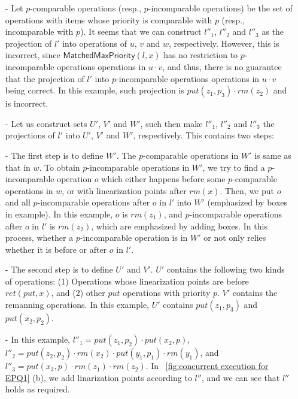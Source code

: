 \begin{itemize}
\setlength{\itemsep}{0.5pt}
\item[-] Let $p$-comparable operations (resp., $p$-incomparable operations) be the set of operations with items whose priority is comparable with $p$ (resp., incomparable with $p$). It seems that we can construct $l''_1$, $l''_2$ and $l''_3$ as the projection of $l'$ into operations of $u$, $v$ and $w$, respectively. However, this is incorrect, since $\mathsf{MatchedMaxPriority}(l,x)$ has no restriction to $p$-incomparable operations operations in $u \cdot v$, and thus, there is no guarantee that the projection of $l'$ into $p$-incomparable operations operations in $u \cdot v$ being correct. In this example, such projection is $\textit{put}(z_1,p_3) \cdot \textit{rm}(z_2)$ and is incorrect.

\item[-] Let us construct sets $U'$, $V'$ and $W'$, such then make $l''_1$, $l''_2$ and $l''_3$ the projections of $l'$ into $U'$, $V'$ and $W'$, respectively. This contains two steps:

\item[-] The first step is to define $W'$. The $p$-comparable operations in $W'$ is same as that in $w$. To obtain $p$-incomparable operations in $W'$, we try to find a $p$-incomparable operation $o$ which either happens before some $p$-comparable operations in $w$, or with linearization points after $\textit{rm}(x)$. Then, we put $o$ and all $p$-incomparable operations after $o$ in $l'$ into $W'$ (emphasized by boxes in example). In this example, $o$ is $\textit{rm}(z_1)$, and $p$-incomparable operations after $o$ in $l'$ is $\textit{rm}(z_2)$, which are emphasized by adding boxes. In this process, whether a $p$-incomparable operation is in $W'$ or not only relies whether it is before or after $o$ in $l'$. 

\item[-] The second step is to define $U'$ and $V'$. $U'$ contains the following two kinds of operations: (1) Operations whose linearization points are before $\textit{ret}(\textit{put},x)$, and (2) other $\textit{put}$ operations with priority $p$. $V'$ contains the remanning operations. In this example, $U'$ contains $\textit{put}(z_1,p_3)$ and $\textit{put}(x_2,p_2)$.

\item[-] In this example, $l''_1 = \textit{put}(z_1,p_2) \cdot \textit{put}(x_2,p)$, $l''_2 = \textit{put}(z_2,p_2) \cdot \textit{rm}(x_2) \cdot \textit{put}(y_1,p_1) \cdot \textit{rm}(y_1)$, and $l''_3 = \textit{put}(x_3,p) \cdot \textit{rm}(z_1) \cdot \textit{rm}(z_2)$. In \figurename~\ref{fig:concurrent execution for EPQ1} (b), we add linarization points according to $l''$, and we can see that $l''$ holds as required.
\end{itemize}


